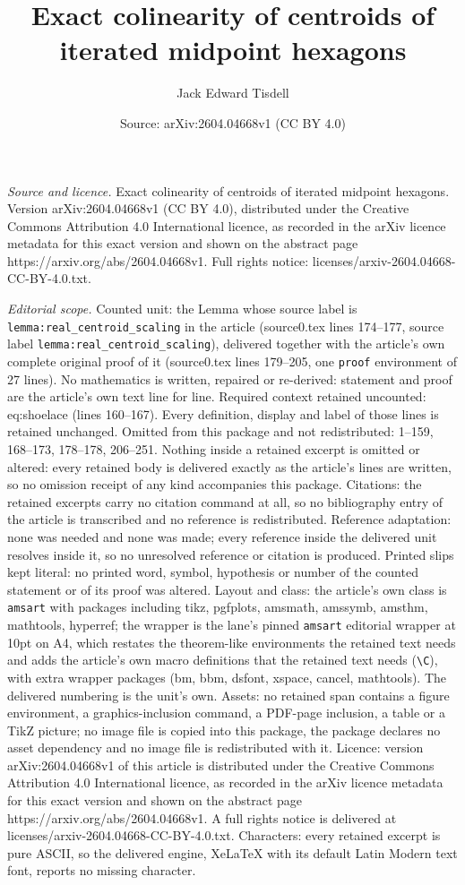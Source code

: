 \documentclass[10pt,a4paper]{amsart}
\title[Exact colinearity of centroids of iterated midpoint hexagons]{Exact colinearity of centroids of iterated midpoint hexagons}
\author{Jack Edward Tisdell}
\date{Source: arXiv:2604.04668v1 (CC BY 4.0)}
\begin{document}
\maketitle

\noindent\emph{Source and licence.} Exact colinearity of centroids of iterated midpoint hexagons. Version arXiv:2604.04668v1 (CC BY 4.0), distributed under the Creative Commons Attribution 4.0 International licence, as recorded in the arXiv licence metadata for this exact version and shown on the abstract page https://arxiv.org/abs/2604.04668v1. Full rights notice: licenses/arxiv-2604.04668-CC-BY-4.0.txt.\par\smallskip

\noindent\textit{Editorial scope.} Counted unit: the Lemma whose source label is \texttt{lemma:real\_centroid\_scaling} in the article (source0.tex lines 174--177, source label \texttt{lemma:real\_centroid\_scaling}), delivered together with the article's own complete original proof of it (source0.tex lines 179--205, one \texttt{proof} environment of 27 lines). No mathematics is written, repaired or re-derived: statement and proof are the article's own text line for line. Required context retained uncounted: eq:shoelace (lines 160--167). Every definition, display and label of those lines is retained unchanged. Omitted from this package and not redistributed: 1--159, 168--173, 178--178, 206--251. Nothing inside a retained excerpt is omitted or altered: every retained body is delivered exactly as the article's lines are written, so no omission receipt of any kind accompanies this package. Citations: the retained excerpts carry no citation command at all, so no bibliography entry of the article is transcribed and no reference is redistributed. Reference adaptation: none was needed and none was made; every reference inside the delivered unit resolves inside it, so no unresolved reference or citation is produced. Printed slips kept literal: no printed word, symbol, hypothesis or number of the counted statement or of its proof was altered. Layout and class: the article's own class is \texttt{amsart} with packages including tikz, pgfplots, amsmath, amssymb, amsthm, mathtools, hyperref; the wrapper is the lane's pinned \texttt{amsart} editorial wrapper at 10pt on A4, which restates the theorem-like environments the retained text needs and adds the article's own macro definitions that the retained text needs (\texttt{\textbackslash C}), with extra wrapper packages (bm, bbm, dsfont, xspace, cancel, mathtools). The delivered numbering is the unit's own. Assets: no retained span contains a figure environment, a graphics-inclusion command, a PDF-page inclusion, a table or a TikZ picture; no image file is copied into this package, the package declares no asset dependency and no image file is redistributed with it. Licence: version arXiv:2604.04668v1 of this article is distributed under the Creative Commons Attribution 4.0 International licence, as recorded in the arXiv licence metadata for this exact version and shown on the abstract page https://arxiv.org/abs/2604.04668v1. A full rights notice is delivered at licenses/arxiv-2604.04668-CC-BY-4.0.txt. Characters: every retained excerpt is pure ASCII, so the delivered engine, XeLaTeX with its default Latin Modern text font, reports no missing character.
\end{document}
